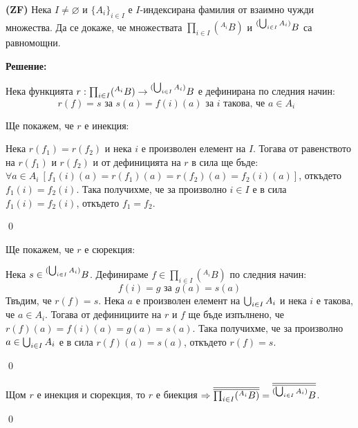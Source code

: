 \begin{problem}
\textbf{(ZF)}
Нека $I \ne \varnothing$ и $\{A_i\}_{i \in I}$ е $I$-индексирана фамилия от взаимно чужди множества.
Да се докаже, че множествата $\prod_{i \in I} ({}^{A_i} B)$ и ${}^{(\bigcup_{i \in I} A_i)} B$ са равномощни.
\end{problem}

\textbf{Решение:}

\smallbreak
\quad
Нека функцията
$r: \prod_{i \in I} ({}^{A_i} B) \to {}^{(\bigcup_{i \in I} A_i)} B$
е дефинирана по следния начин:
\[
r(f) = s \text{ за }
s(a) = f(i)(a) \text{ за $i$ такова, че $a \in A_i$ }
\]

Ще покажем, че $r$ е инекция:

\begin{tcolorbox}[mybox={Доказателство:}]
\quad
Нека $r(f_1) = r(f_2)$ и нека $i$ е произволен елемент на $I$.
Тогава от равенството на $r(f_1)$ и $r(f_2)$ и от дефиницията на $r$ в сила ще бъде:
$\forall a \in A_i\ [ f_1(i)(a) = r(f_1)(a) = r(f_2)(a) = f_2(i)(a)]$,
откъдето $f_1(i) = f_2(i)$.
Така получихме, че за произволно $i \in I$ е в сила $f_1(i) = f_2(i)$, откъдето
$f_1 = f_2$.

\qed
\end{tcolorbox}

\quad
Ще покажем, че $r$ е сюрекция:

\begin{tcolorbox}[mybox={Доказателство:}]
\quad
Нека $s \in {}^{(\bigcup_{i \in I} A_i)} B$.
Дефинираме $f \in \prod_{i \in I} ({}^{A_i} B)$ по следния начин:
\[
f(i) = g \text{ за }
g(a) = s(a)
\]
\quad
Твъдим, че $r(f) = s$.
Нека $a$ е произволен елемент на $\bigcup_{i \in I} A_i$ и нека $i$ е такова, че $a \in A_i$.
Тогава от дефинициите на $r$ и $f$ ще бъде изпълнено, че $r(f)(a) = f(i)(a) = g(a) = s(a)$.
Така получихме, че за произволно $a \in \bigcup_{i \in I} A_i$ е в сила $r(f)(a) = s(a)$, откъдето $r(f) = s$.

\qed
\end{tcolorbox}


\quad
Щом $r$ е инекция и сюрекция, то $r$ е биекция
$\Rightarrow \overline{\overline{\prod_{i \in I} ({}^{A_i} B)}} = \overline{\overline{{}^{(\bigcup_{i \in I} A_i)} B}}$.

\qed
